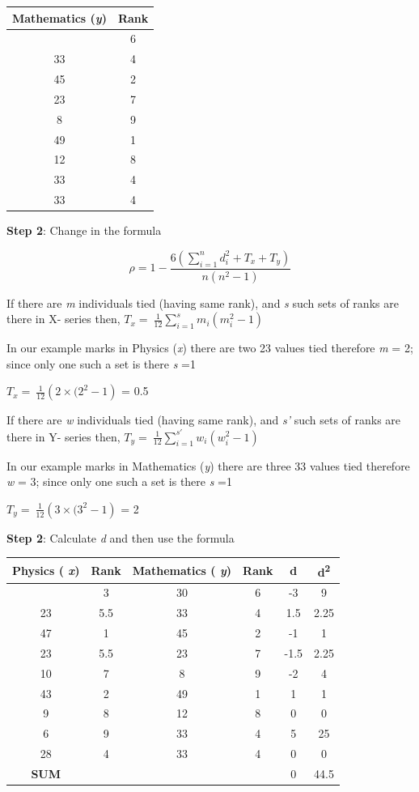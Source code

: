 \documentclass[
]{book}
\begin{document}
\begin{longtable}[]{@{}cc@{}}
\toprule\noalign{}
Mathematics (\emph{y}) & Rank \\
\midrule\noalign{}
\endhead
\bottomrule\noalign{}
\endlastfoot
30 & 6 \\
33 & 4 \\
45 & 2 \\
23 & 7 \\
8 & 9 \\
49 & 1 \\
12 & 8 \\
33 & 4 \\
33 & 4 \\
\end{longtable}

\textbf{Step 2}: Change in the formula

\[\rho = 1 - \frac{6\left( \sum_{i = 1}^{n}d_{i}^{2} + T_{x} + T_{y} \right)}{n\left( n^{2} - 1 \right)}\]

If there are \emph{m} individuals tied (having same rank), and \emph{s} such sets
of ranks are there in X- series then,
\(T_{x} = \ \frac{1}{12}\sum_{i = 1}^{s}{m_{i}\left( m_{i}^{2} - 1 \right)}\)

In our example marks in Physics (\emph{x}) there are two 23 values tied
therefore \emph{m} = 2; since only one such a set is there \emph{s} =1

\(T_{x} = \ \frac{1}{12}\left( 2 \times (2^{2} - 1 \right)\) = 0.5

If there are \emph{w} individuals tied (having same rank), and \emph{s'} such sets
of ranks are there in Y- series then,
\(T_{y} = \ \frac{1}{12}\sum_{i = 1}^{s'}{w_{i}\left( w_{i}^{2} - 1 \right)}\)

In our example marks in Mathematics (\emph{y}) there are three 33 values tied
therefore \emph{w} = 3; since only one such a set is there \emph{s} =1

\(T_{y} = \ \frac{1}{12}\left( 3 \times (3^{2} - 1 \right)\) = 2

\textbf{Step 2}: Calculate \emph{d} and then use the formula

\begin{longtable}[]{@{}cccccc@{}}
\toprule\noalign{}
Physics ( \emph{x}) & Rank & Mathematics ( \emph{y}) & Rank & d & d\textsuperscript{2} \\
\midrule\noalign{}
\endhead
\bottomrule\noalign{}
\endlastfoot
35 & 3 & 30 & 6 & -3 & 9 \\
23 & 5.5 & 33 & 4 & 1.5 & 2.25 \\
47 & 1 & 45 & 2 & -1 & 1 \\
23 & 5.5 & 23 & 7 & -1.5 & 2.25 \\
10 & 7 & 8 & 9 & -2 & 4 \\
43 & 2 & 49 & 1 & 1 & 1 \\
9 & 8 & 12 & 8 & 0 & 0 \\
6 & 9 & 33 & 4 & 5 & 25 \\
28 & 4 & 33 & 4 & 0 & 0 \\
\textbf{SUM} & & & & 0 & 44.5 \\
\end{longtable}
\end{document}
